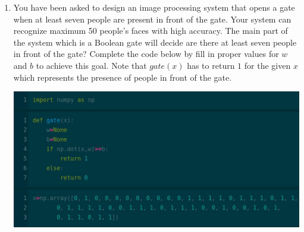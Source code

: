 \documentclass[12pt,a4paper]{article} %
\begin{document}
\begin{enumerate}
\item You have been asked to design an image processing system that opens a gate when at least seven people are present in front of the gate. Your system can recognize maximum 50 people's faces with high accuracy. The main part of the system which is a Boolean gate will decide are there at least seven people in front of the gate? Complete the code below by fill in proper values for $w$ and $b$ to achieve this goal. Note that $gate(x)$ has to return $1$ for the given $x$ which represents the presence of people in front of the gate.

\includegraphics[scale=0.4]{ex4}

\end{enumerate}
\end{document}
